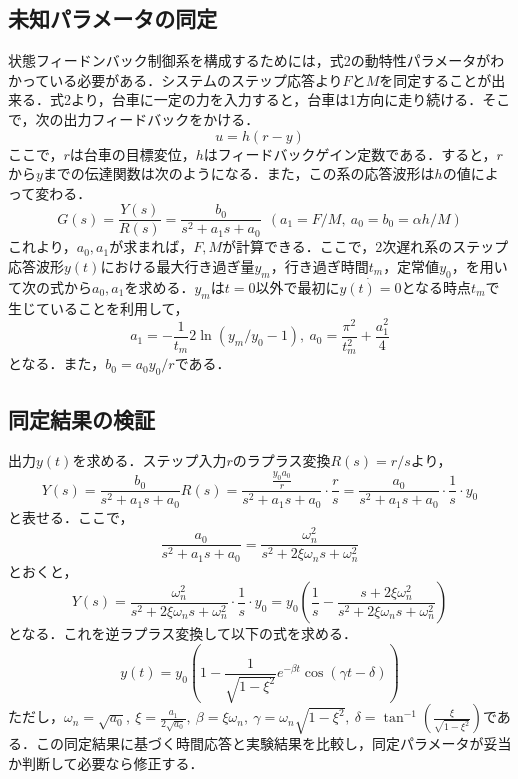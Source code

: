 \documentclass[11pt,a4paper]{jsarticle}
\begin{document}
  \subsection{未知パラメータの同定}
  状態フィードンバック制御系を構成するためには，式2の動特性パラメータがわかっている必要がある．システムのステップ応答より$F$と$M$を同定することが出来る．式2より，台車に一定の力を入力すると，台車は1方向に走り続ける．そこで，次の出力フィードバックをかける．
  \begin{equation}
   u = h(r-y)
  \end{equation}
  ここで，$r$は台車の目標変位，$h$はフィードバックゲイン定数である．すると，$r$から$y$までの伝達関数は次のようになる．また，この系の応答波形は$h$の値によって変わる．
  \begin{equation}
 G(s) = \frac{Y(s)}{R(s)} = \frac{b_0}{s^2+a_1 s +a_0} \ \ (a_1 = F/M,\ a_0 = b_0 = \alpha h/M)
  \end{equation}
  これより，$a_0,a_1$が求まれば，$F,M$が計算できる．ここで，2次遅れ系のステップ応答波形$y(t)$における最大行き過ぎ量$y_m$，行き過ぎ時間$t_m$，定常値$y_0$，を用いて次の式から$a_0,a_1$を求める．$y_m$は$t=0$以外で最初に$\dot{y(t) = 0}$となる時点$t_m$で生じていることを利用して，
  \begin{equation}
   a_1 = -\frac{1}{t_m}2\ln{(y_m/y_0 - 1)}, \ a_0 = \frac{\pi^2}{t_m^2} + \frac{a_1^2}{4}
  \end{equation}
  となる．また，$b_0 = a_0 y_0 /r$である．

  \subsection{同定結果の検証}  
  出力$y(t)$を求める．ステップ入力$r$のラプラス変換$R(s)=r/s$より，
  \begin{equation}
   Y(s) = \frac{b_0}{s^2+a_1 s +a_0}R(s) = \frac{\frac{y_0a_0}{r}}{s^2+a_1 s +a_0} \cdot \frac{r}{s} = \frac{a_0}{s^2+a_1 s +a_0} \cdot \frac{1}{s} \cdot y_0
  \end{equation}
  と表せる．ここで，
  \begin{equation}
   \frac{a_0}{s^2+a_1 s +a_0} = \frac{\omega_n^2}{s^2+2\xi \omega_n s +\omega_n^2}
  \end{equation}
  とおくと，
  \begin{equation}
   Y(s) = \frac{\omega_n^2}{s^2+2\xi \omega_n s +\omega_n^2}\cdot \frac{1}{s} \cdot y_0 
        = y_0 \left( \frac{1}{s} - \frac{s + 2\xi\omega_n^2}{s^2+2\xi \omega_n s +\omega_n^2} \right)
  \end{equation}
  となる．これを逆ラプラス変換して以下の式を求める．
  \begin{equation}
   y(t) = y_0 \left( 1-\frac{1}{\sqrt{1-\xi^2}}e^{-\beta t} \cos{(\gamma t-\delta)} \right)
  \end{equation}
  ただし，$\omega_n = \sqrt{a_0},\ \xi = \frac{a_1}{2\sqrt{a_0}},\ \beta = \xi \omega_n,\ \gamma = \omega_n \sqrt{1-\xi^2},\ \delta = \tan^{-1} \left(\frac{\xi}{\sqrt{1-\xi^2}} \right)$である．この同定結果に基づく時間応答と実験結果を比較し，同定パラメータが妥当か判断して必要なら修正する．
\end{document}
